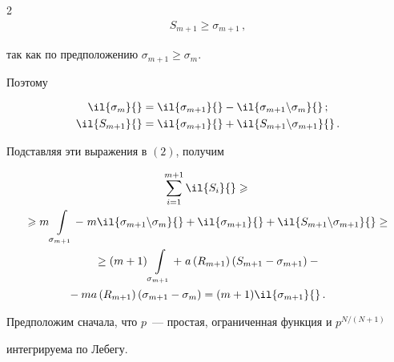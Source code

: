 \begin{multicols}{2}
\begin{multline*}




S_{m+1} \geqslant \sigma_{m+1}\,,


\end{multline*}


так как по предположению $\sigma_{m+1}\geqslant \sigma_m$.





Поэтому


\begin{align*}


\il{\sigma_m}{}&=\il{\sigma_{m+1}}{}-\il{\sigma_{m+1}\backslash \sigma_m}{}\,; \\




\il{S_{m+1}}{}&=\il{\sigma_{m+1}}{}+\il{S_{m+1}\backslash \sigma_{m+1}}{}\,.


\end{align*}


Подставляя эти выражения в $(2)$, получим


\begin{multline*}


\suml{i=1}{m+1}\il{S_i}{}  \geqslant{}\\


{}\geqslant  m \int\limits_{\sigma_{m+1}} -\; m \il{\sigma_{m+1}\backslash


\sigma_m}{} +  \il{\sigma_{m+1}}{}  + \il{S_{m+1}\backslash \sigma_{m+1}}{} \geq{}


\\


{}\geq


 (m+1) \int\limits_{\sigma_{m+1}}  +\;  a\left ( R_{m+1}\right )(S_{m+1}- \sigma_{m+1})  - {}\\


 {}- m a\left ( R_{m+1}\right )(\sigma_{m+1} - \sigma_m) =


 (m+1) \il{\sigma_{m+1}}{} \,. \qquad  %


\end{multline*}





Предположим сначала, что $p$~--- простая, ограниченная функция и $p^{N/(N+1)}$


интегрируема по Лебегу.





\smallskip






\end{multicols}
